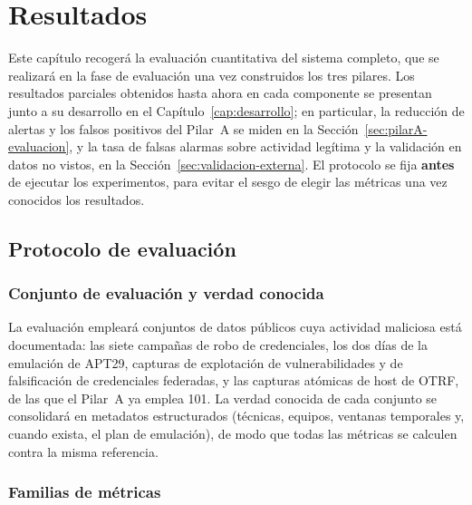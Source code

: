 \chapter{Resultados}
\label{cap:resultados}

Este capítulo recogerá la evaluación cuantitativa del sistema completo, que se realizará en
la fase de evaluación una vez construidos los tres pilares. Los resultados parciales obtenidos
hasta ahora en cada componente se presentan junto a su desarrollo en el
Capítulo~\ref{cap:desarrollo}; en particular, la reducción de alertas y los falsos positivos
del Pilar~A se miden en la Sección~\ref{sec:pilarA-evaluacion}, y la tasa de falsas alarmas sobre
actividad legítima y la validación en datos no vistos, en la Sección~\ref{sec:validacion-externa}. El protocolo se fija \textbf{antes} de ejecutar los
experimentos, para evitar el sesgo de elegir las métricas una vez conocidos los resultados.

\section{Protocolo de evaluación}

\subsection{Conjunto de evaluación y verdad conocida}

La evaluación empleará conjuntos de datos públicos cuya actividad maliciosa está documentada:
las siete campañas de robo de credenciales, los dos días de la emulación de APT29, capturas de
explotación de vulnerabilidades y de falsificación de credenciales federadas, y las capturas
atómicas de host de OTRF, de las que el Pilar~A ya emplea 101. La verdad conocida de cada conjunto se consolidará en
metadatos estructurados (técnicas, equipos, ventanas temporales y, cuando exista, el plan de
emulación), de modo que todas las métricas se calculen contra la misma referencia.

\subsection{Familias de métricas}

